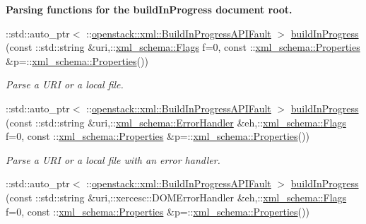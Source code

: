 \begin{Indent}{\bf Parsing functions for the buildInProgress document root.}\par
\begin{DoxyCompactItemize}
\item 
::std::auto\_\-ptr$<$ ::\hyperlink{classopenstack_1_1xml_1_1BuildInProgressAPIFault}{openstack::xml::BuildInProgressAPIFault} $>$ \hyperlink{namespaceopenstack_1_1xml_afa47ad8845a0fc662a392fa08dc2e495}{buildInProgress} (const ::std::string \&uri,::\hyperlink{namespacexml__schema_affb4c227cbd9aa7453dd1dc5a1401943}{xml\_\-schema::Flags} f=0, const ::\hyperlink{namespacexml__schema_ad27ce19a7ee1d3b1064092648898f64c}{xml\_\-schema::Properties} \&p=::\hyperlink{namespacexml__schema_ad27ce19a7ee1d3b1064092648898f64c}{xml\_\-schema::Properties}())
\begin{DoxyCompactList}\small\item\em Parse a URI or a local file. \item\end{DoxyCompactList}\item 
::std::auto\_\-ptr$<$ ::\hyperlink{classopenstack_1_1xml_1_1BuildInProgressAPIFault}{openstack::xml::BuildInProgressAPIFault} $>$ \hyperlink{namespaceopenstack_1_1xml_ab2e32da0748887b65e31bb0f796a94cf}{buildInProgress} (const ::std::string \&uri,::\hyperlink{namespacexml__schema_ab1c9361bfd3b404eaabf0c31eded79dc}{xml\_\-schema::ErrorHandler} \&eh,::\hyperlink{namespacexml__schema_affb4c227cbd9aa7453dd1dc5a1401943}{xml\_\-schema::Flags} f=0, const ::\hyperlink{namespacexml__schema_ad27ce19a7ee1d3b1064092648898f64c}{xml\_\-schema::Properties} \&p=::\hyperlink{namespacexml__schema_ad27ce19a7ee1d3b1064092648898f64c}{xml\_\-schema::Properties}())
\begin{DoxyCompactList}\small\item\em Parse a URI or a local file with an error handler. \item\end{DoxyCompactList}\item 
::std::auto\_\-ptr$<$ ::\hyperlink{classopenstack_1_1xml_1_1BuildInProgressAPIFault}{openstack::xml::BuildInProgressAPIFault} $>$ \hyperlink{namespaceopenstack_1_1xml_a89c7de393c727928a885d7113f6378bb}{buildInProgress} (const ::std::string \&uri,::xercesc::DOMErrorHandler \&eh,::\hyperlink{namespacexml__schema_affb4c227cbd9aa7453dd1dc5a1401943}{xml\_\-schema::Flags} f=0, const ::\hyperlink{namespacexml__schema_ad27ce19a7ee1d3b1064092648898f64c}{xml\_\-schema::Properties} \&p=::\hyperlink{namespacexml__schema_ad27ce19a7ee1d3b1064092648898f64c}{xml\_\-schema::Properties}())

\end{DoxyCompactItemize}
\end{Indent}
